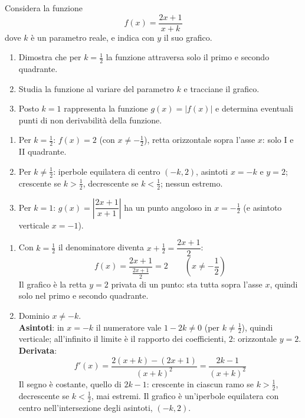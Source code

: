 \begin{question}[ID=3.1, subtitle={Studio di $f(x)=(2x+1)/(x+k)$ con parametro $k$}, tags={studio di funzione, parametrico}, difficulty=difficile]
Considera la funzione
\begin{equation*}
    f(x) = \frac{2x+1}{x+k}
\end{equation*}
dove $k$ è un parametro reale, e indica con $y$ il suo grafico.
\begin{enumerate}
    \item Dimostra che per $k=\frac{1}{2}$ la funzione attraversa solo il primo e secondo quadrante.
    \item Studia la funzione al variare del parametro $k$ e tracciane il grafico.
    \item Posto $k=1$ rappresenta la funzione $g(x) = |f(x)|$ e determina eventuali punti di non derivabilità della funzione.
\end{enumerate}
\begin{solution}
\begin{enumerate}
    \item Per $k=\tfrac12$: $f(x)=2$ (con $x\neq-\tfrac12$), retta orizzontale sopra l'asse $x$: solo I e II quadrante.
    \item Per $k\neq\tfrac12$: iperbole equilatera di centro $(-k,2)$, asintoti $x=-k$ e $y=2$; crescente se $k>\tfrac12$, decrescente se $k<\tfrac12$; nessun estremo.
    \item Per $k=1$: $g(x)=\left|\dfrac{2x+1}{x+1}\right|$ ha un punto angoloso in $x=-\tfrac12$ (e asintoto verticale $x=-1$).
\end{enumerate}
\end{solution}
\begin{explanation}
\begin{enumerate}
    \item Con $k=\tfrac12$ il denominatore diventa $x+\tfrac12=\dfrac{2x+1}{2}$:
    \[ f(x)=\dfrac{2x+1}{\frac{2x+1}{2}}=2 \qquad (x\neq-\dfrac12) \]
    Il grafico è la retta $y=2$ privata di un punto: sta tutta sopra l'asse $x$, quindi solo nel primo e secondo quadrante.
    \item Dominio $x\neq-k$. \\
    \textbf{Asintoti}: in $x=-k$ il numeratore vale $1-2k\neq0$ (per $k\neq\tfrac12$), quindi verticale; all'infinito il limite è il rapporto dei coefficienti, $2$: orizzontale $y=2$. \\
    \textbf{Derivata}:
    \[ f'(x)=\dfrac{2(x+k)-(2x+1)}{(x+k)^2}=\dfrac{2k-1}{(x+k)^2} \]
    Il segno è costante, quello di $2k-1$: crescente in ciascun ramo se $k>\tfrac12$, decrescente se $k<\tfrac12$, mai estremi. Il grafico è un'iperbole equilatera con centro nell'intersezione degli asintoti, $(-k,2)$.

\end{enumerate}
\end{explanation}
\end{question}
